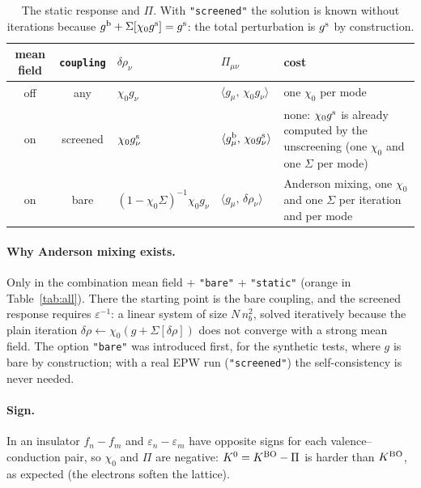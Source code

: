 \documentclass[11pt]{article}
\newcommand{\gs}{g^{\rm s}}
\newcommand{\gb}{g^{\rm b}}
\newcommand{\KBO}{K^{\rm BO}}
\newcommand{\inner}[2]{\langle #1,\,#2\rangle}
\begin{document}
\begin{table}[h]
\centering
\renewcommand{\arraystretch}{1.5}
\begin{tabularx}{\textwidth}{@{}c c l l L@{}}
\toprule
mean field & \texttt{coupling} & $\delta\rho_\nu$ & $\Pi_{\mu\nu}$ & cost \\
\midrule
off & any      & $\chi_0 g_\nu$ & $\inner{g_\mu}{\chi_0 g_\nu}$ & one $\chi_0$ per mode \\
on  & screened & $\chi_0\gs_\nu$ & $\inner{\gb_\mu}{\chi_0\gs_\nu}$ & none: $\chi_0\gs$ is already computed by the
  unscreening (one $\chi_0$ and one $\Sigma$ per mode) \\
on  & bare     & $(1-\chi_0\Sigma)^{-1}\chi_0 g_\nu$ & $\inner{g_\mu}{\delta\rho_\nu}$ & Anderson mixing, one $\chi_0$
  and one $\Sigma$ per iteration and per mode \\
\bottomrule
\end{tabularx}
\caption{The static response and $\Pi$. With \texttt{"screened"} the solution is known without iterations because
$\gb + \Sigma[\chi_0\gs] = \gs$: the total perturbation is $\gs$ by construction.}
\label{tab:pi}
\end{table}

\paragraph{Why Anderson mixing exists.} Only in the combination mean field + \texttt{"bare"} + \texttt{"static"}
(orange in Table~\ref{tab:all}). There the starting point is the bare coupling, and the screened response requires
$\varepsilon^{-1}$: a linear system of size $N\,n_b^2$, solved iteratively because the plain iteration
$\delta\rho \leftarrow \chi_0(g+\Sigma[\delta\rho])$ does not converge with a strong mean field. The option
\texttt{"bare"} was introduced first, for the synthetic tests, where $g$ is bare by construction; with a real EPW
run (\texttt{"screened"}) the self-consistency is never needed.

\paragraph{Sign.} In an insulator $f_n-f_m$ and $\varepsilon_n-\varepsilon_m$ have opposite signs for each
valence--conduction pair, so $\chi_0$ and $\Pi$ are negative: $K^0 = \KBO-\Pi$ is harder than $\KBO$, as expected
(the electrons soften the lattice).
\end{document}

